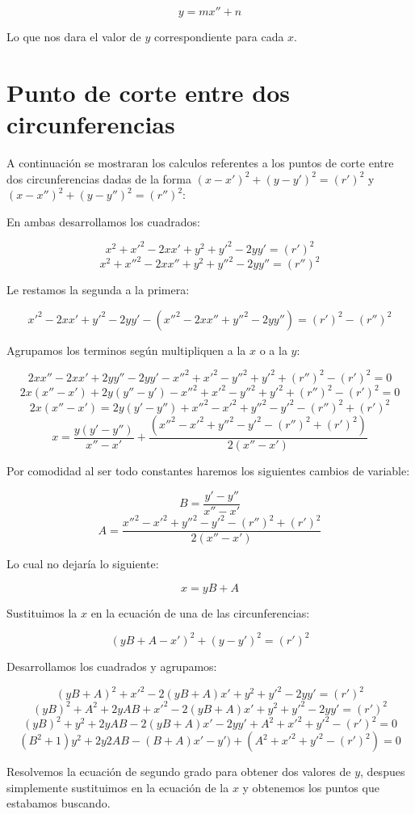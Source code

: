 $$y = mx'' + n$$

Lo que nos dara el valor de $y$ correspondiente para cada $x$.\par

\section{Punto de corte entre dos circunferencias}\label{c-c}

A continuación se mostraran los calculos referentes a los puntos de corte entre dos circunferencias dadas de la forma $(x-x')^2 + (y -y')^2 = (r')^2$ y $(x-x'')^2 + (y -y'')^2 = (r'')^2$: \par

En ambas desarrollamos los cuadrados:\par

$$x^2 + x'^2 - 2xx' + y^2 + y'^2 - 2yy' = (r')^2$$
$$x^2 + x''^2 - 2xx'' + y^2 + y''^2 - 2yy'' = (r'')^2$$

Le restamos la segunda a la primera:\par

$$x'^2 - 2xx' + y'^2 - 2yy' -(x''^2 - 2xx'' + y''^2 - 2yy'') = (r')^2 - (r'')^2$$

Agrupamos los terminos según multipliquen a la $x$ o a la $y$:\par

$$ 2xx'' - 2xx' + 2yy'' - 2yy' - x''^2 + x'^2 - y''^2 + y'^2 + (r'')^2 - (r')^2 = 0$$
$$ 2x(x'' - x') + 2y(y'' - y') - x''^2 + x'^2 - y''^2 + y'^2 + (r'')^2 - (r')^2 = 0$$
$$ 2x(x'' - x') = 2y(y' - y'') + x''^2 - x'^2 + y''^2 - y'^2 - (r'')^2 + (r')^2 $$
$$ x =\frac{y(y' - y'')}{x'' - x'} + \frac{(x''^2 - x'^2 + y''^2 - y'^2 - (r'')^2 + (r')^2)}{2(x'' - x')} $$

Por comodidad al ser todo constantes haremos los siguientes cambios de variable:\par

$$B = \frac{y' - y''}{x'' - x'}$$
$$A = \frac{x''^2 - x'^2 + y''^2 - y'^2 - (r'')^2 + (r')^2}{2(x'' - x')}$$

Lo cual no dejaría lo siguiente:\par

$$ x = yB + A$$

Sustituimos la $x$ en la ecuación de una de las circunferencias:\par

$$(yB + A-x')^2 + (y -y')^2 = (r')^2$$

Desarrollamos los cuadrados y agrupamos:\par

$$(yB + A)^2 + x'^2 - 2(yB + A)x' + y^2 + y'^2 - 2yy' = (r')^2$$
$$ (yB)^2 + A^2 + 2yAB + x'^2 - 2(yB + A)x' + y^2 + y'^2 - 2yy' = (r')^2$$
$$ (yB)^2 + y^2 + 2yAB - 2(yB + A)x' - 2yy' + A^2 + x'^2 + y'^2 - (r')^2 = 0$$
$$ (B^2 + 1)y^2 + 2y2AB - (B + A)x' - y') + (A^2 + x'^2 + y'^2 - (r')^2) = 0$$

Resolvemos la ecuación de segundo grado para obtener dos valores de $y$, despues simplemente sustituimos en la ecuación de la $x$ y obtenemos los puntos que estabamos buscando.\par
